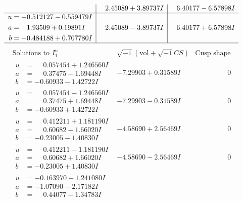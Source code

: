 \documentclass[1p]{elsarticle_modified}
\theoremstyle{definition}
\newcommand{\I}{\sqrt{-1}}
\begin{document}
$$\begin{array}{c|c|c}
 & \phantom{-}2.45089 + 3.89737 I & \phantom{-}6.40177 - 6.57898 I \\ \hline\begin{aligned}
u &= -0.512127 - 0.559479 I \\
a &= \phantom{-}1.93509 + 0.19891 I \\
b &= -0.484188 + 0.707780 I\end{aligned}
 & \phantom{-}2.45089 - 3.89737 I & \phantom{-}6.40177 + 6.57898 I\\
 \hline 
 \end{array}$$\newpage$$\begin{array}{c|c|c}  
\text{Solutions to }I^u_{1}& \I (\text{vol} + \sqrt{-1}CS) & \text{Cusp shape}\\
 \hline 
\begin{aligned}
u &= \phantom{-}0.057454 + 1.246560 I \\
a &= \phantom{-}0.37475 - 1.69448 I \\
b &= -0.60933 - 1.42722 I\end{aligned}
 & -7.29903 + 0.31589 I & \phantom{-0.000000 } 0 \\ \hline\begin{aligned}
u &= \phantom{-}0.057454 - 1.246560 I \\
a &= \phantom{-}0.37475 + 1.69448 I \\
b &= -0.60933 + 1.42722 I\end{aligned}
 & -7.29903 - 0.31589 I & \phantom{-0.000000 } 0 \\ \hline\begin{aligned}
u &= \phantom{-}0.412211 + 1.181190 I \\
a &= \phantom{-}0.60682 - 1.66020 I \\
b &= -0.23005 - 1.40830 I\end{aligned}
 & -4.58690 + 2.56469 I & \phantom{-0.000000 } 0 \\ \hline\begin{aligned}
u &= \phantom{-}0.412211 - 1.181190 I \\
a &= \phantom{-}0.60682 + 1.66020 I \\
b &= -0.23005 + 1.40830 I\end{aligned}
 & -4.58690 - 2.56469 I & \phantom{-0.000000 } 0 \\ \hline\begin{aligned}
u &= -0.163970 + 1.241080 I \\
a &= -1.07090 - 2.17182 I \\
b &= \phantom{-}0.44077 - 1.34783 I\end{aligned}

\end{array}$$
\end{document}
